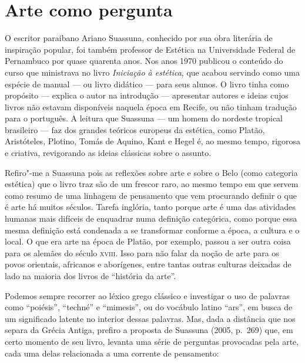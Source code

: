 \chapter{Arte como pergunta}

O escritor paraibano Ariano Suassuna, conhecido por sua obra literária
de inspiração popular, foi também professor de Estética na Universidade
Federal de Pernambuco por quase quarenta anos. Nos anos 1970 publicou o
conteúdo do curso que ministrava no livro \emph{Iniciação à estética},
que acabou servindo como uma espécie de manual --- ou livro didático ---
para seus alunos. O livro tinha como propósito --- explica o autor na
introdução --- apresentar autores e ideias cujos livros não estavam
disponíveis naquela época em Recife, ou não tinham tradução para o
português. A leitura que Suassuna --- um homem do nordeste tropical
brasileiro --- faz dos grandes teóricos europeus da estética, como
Platão, Aristóteles, Plotino, Tomás de Aquino, Kant e Hegel é, ao mesmo
tempo, rigorosa e criativa, revigorando as ideias clássicas sobre o
assunto.

Refiro"-me a Suassuna pois as reflexões sobre arte e sobre o Belo (como
categoria estética) que o livro traz são de um frescor raro, ao mesmo
tempo em que servem como resumo de uma linhagem de pensamento que vem
procurando definir o que é arte há muitos séculos. Tarefa inglória,
tanto porque arte é uma das atividades humanas mais difíceis de enquadrar
numa definição categórica, como porque essa mesma definição está
condenada a se transformar conforme a época, a cultura e o local. O que era arte na época de Platão, por exemplo, passou a ser outra coisa para os alemães do século \textsc{xviii}. Isso para não falar da noção de arte para os povos orientais, africanos e aborígenes, entre tantas outras culturas deixadas de lado na maioria dos livros de ``história da arte''.

Podemos sempre recorrer ao léxico grego clássico e investigar o uso de
palavras como ``poiésis'', ``techné'' e ``mimesis'', ou do vocábulo
latino ``ars'', em busca de um significado latente no interior dessas
palavras. Mas, dada a distância que nos separa da Grécia Antiga, prefiro
a proposta de Suassuna (2005, p.~269) que, em certo momento de seu
livro, levanta uma série de perguntas provocadas pela arte, cada uma
delas relacionada a uma corrente de pensamento:

